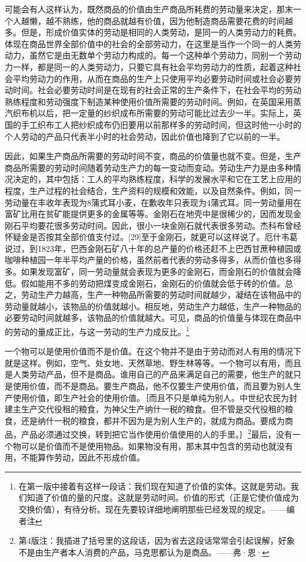\documentclass{ctexbook}
\begin{document}
    可能会有人这样认为，既然商品的价值由生产商品所耗费的劳动量来决定，那末一个人越懒，越不熟练，他的商品就越有价值，因为他制造商品需要花费的时间越多。但是，形成价值实体的劳动是相同的人类劳动，是同一的人类劳动力的耗费。体现在商品世界全部价值中的社会的全部劳动力，在这里是当作一个同一的人类劳动力，虽然它是由无数单个劳动力构成的。每一个这种单个劳动力，同别一个劳动力一样，都是同一的人类劳动力，只要它具有社会平均劳动力的性质，起着这种社会平均劳动力的作用，从而在商品的生产上只使用平均必要劳动时间或社会必要劳动时间。社会必要劳动时间是在现有的社会正常的生产条件下，在社会平均的劳动熟练程度和劳动强度下制造某种使用价值所需要的劳动时间。例如，在英国采用蒸汽织布机以后，把一定量的纱织成布所需要的劳动可能比过去少一半。实际上，英国的手工织布工人把纱织成布仍旧要用以前那样多的劳动时间，但这时他一小时的个人劳动的产品只代表半小时的社会劳动，因此价值也降到了它以前的一半。

    因此，如果生产商品所需要的劳动时间不变，商品的价值量也就不变。但是，生产商品所需要的劳动时间随着劳动生产力的每一变动而变动。劳动生产力是由多种情况决定的，其中包括：工人的平均熟练程度，科学的发展水平和它在工艺上应用的程度，生产过程的社会结合，生产资料的规模和效能，以及自然条件。例如，同一劳动量在丰收年表现为8蒲式耳小麦，在歉收年只表现为4蒲式耳。同一劳动量用在富矿比用在贫矿能提供更多的金属等等。金刚石在地壳中是很稀少的，因而发现金刚石平均要花很多劳动时间。因此，很小一块金刚石就代表很多劳动。杰科布曾经怀疑金是否按其全部价值支付过。[29]至于金刚石，就更可以这样说了。厄什韦葛说过，到1823年，巴西金刚石矿八十年的总产量的价格还赶不上巴西甘蔗种植园或咖啡种植园一年半平均产量的价格，虽然前者代表的劳动多得多，从而价值也多得多。如果发现富矿，同一劳动量就会表现为更多的金刚石，而金刚石的价值就会降低。假如能用不多的劳动把煤变成金刚石，金刚石的价值就会低于砖的价值。总之，劳动生产力越高，生产一种物品所需要的劳动时间就越少，凝结在该物品中的劳动量就越小，该物品的价值就越小。相反地，劳动生产力越低，生产一种物品的必要劳动时间就越多，该物品的价值就越大。可见，商品的价值量与体现在商品中的劳动的量成正比，与这一劳动的生产力成反比。\footnote{在第一版中接着有这样一段话：我们现在知道了价值的实体。这就是劳动。我们知道了价值的量的尺度。这就是劳动时间。价值的形式（正是它使价值成为交换价值），有待分析。现在先要较详细地阐明那些已经发现的规定。——编者注}

    一个物可以是使用价值而不是价值。在这个物并不是由于劳动而对人有用的情况下就是这样。例如，空气、处女地、天然草地、野生林等等。一个物可以有用，而且是人类劳动产品，但不是商品。谁用自己的产品来满足自己的需要，他生产的就只是使用价值，而不是商品。要生产商品，他不仅要生产使用价值，而且要为别人生产使用价值，即生产社会的使用价值。｛而且不只是单纯为别人。中世纪农民为封建主生产交代役租的粮食，为神父生产纳什一税的粮食。但不管是交代役租的粮食，还是纳什一税的粮食，都并不因为是为别人生产的，就成为商品。要成为商品，产品必须通过交换，转到把它当作使用价值使用的人的手里。｝\footnote{第4版注：我插进了括号里的这段话，因为省去这段话常常会引起误解，好象不是由生产者本人消费的产品，马克思都认为是商品。——弗·恩·}最后，没有一个物可以是价值而不是使用物品。如果物没有用，那末其中包含的劳动也就没有用，不能算作劳动，因此不形成价值。
\end{document}
